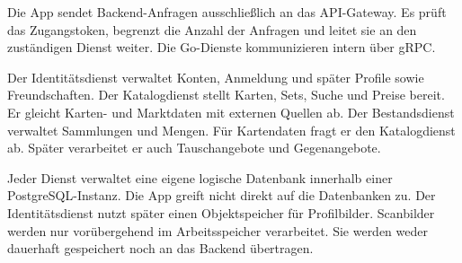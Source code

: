 Die App sendet Backend-Anfragen ausschließlich an das API-Gateway. Es prüft das Zugangstoken, begrenzt die Anzahl der Anfragen und leitet sie an den zuständigen Dienst weiter. Die Go-Dienste kommunizieren intern über gRPC.

Der Identitätsdienst verwaltet Konten, Anmeldung und später Profile sowie Freundschaften. Der Katalogdienst stellt Karten, Sets, Suche und Preise bereit. Er gleicht Karten- und Marktdaten mit externen Quellen ab. Der Bestandsdienst verwaltet Sammlungen und Mengen. Für Kartendaten fragt er den Katalogdienst ab. Später verarbeitet er auch Tauschangebote und Gegenangebote.

Jeder Dienst verwaltet eine eigene logische Datenbank innerhalb einer PostgreSQL-Instanz. Die App greift nicht direkt auf die Datenbanken zu. Der Identitätsdienst nutzt später einen Objektspeicher für Profilbilder. Scanbilder werden nur vorübergehend im Arbeitsspeicher verarbeitet. Sie werden weder dauerhaft gespeichert noch an das Backend übertragen.

